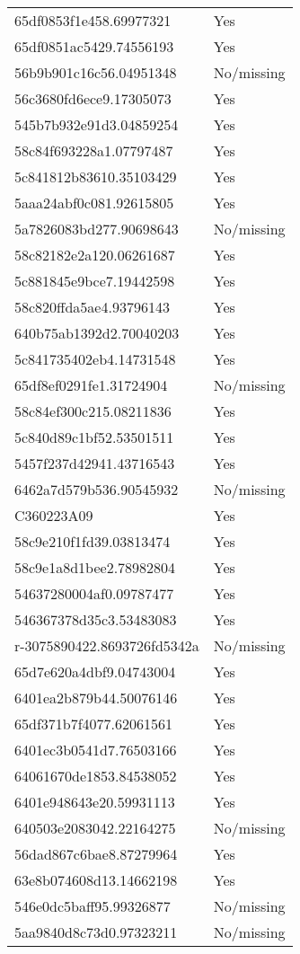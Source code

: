 \begin{tabular}{ll}
65df0853f1e458.69977321 & Yes \\
65df0851ac5429.74556193 & Yes \\
56b9b901c16c56.04951348 & No/missing \\
56c3680fd6ece9.17305073 & Yes \\
545b7b932e91d3.04859254 & Yes \\
58c84f693228a1.07797487 & Yes \\
5c841812b83610.35103429 & Yes \\
5aaa24abf0c081.92615805 & Yes \\
5a7826083bd277.90698643 & No/missing \\
58c82182e2a120.06261687 & Yes \\
5c881845e9bce7.19442598 & Yes \\
58c820ffda5ae4.93796143 & Yes \\
640b75ab1392d2.70040203 & Yes \\
5c841735402eb4.14731548 & Yes \\
65df8ef0291fe1.31724904 & No/missing \\
58c84ef300c215.08211836 & Yes \\
5c840d89c1bf52.53501511 & Yes \\
5457f237d42941.43716543 & Yes \\
6462a7d579b536.90545932 & No/missing \\
C360223A09 & Yes \\
58c9e210f1fd39.03813474 & Yes \\
58c9e1a8d1bee2.78982804 & Yes \\
54637280004af0.09787477 & Yes \\
546367378d35c3.53483083 & Yes \\
r-3075890422.8693726fd5342a & No/missing \\
65d7e620a4dbf9.04743004 & Yes \\
6401ea2b879b44.50076146 & Yes \\
65df371b7f4077.62061561 & Yes \\
6401ec3b0541d7.76503166 & Yes \\
64061670de1853.84538052 & Yes \\
6401e948643e20.59931113 & Yes \\
640503e2083042.22164275 & No/missing \\
56dad867c6bae8.87279964 & Yes \\
63e8b074608d13.14662198 & Yes \\
546e0dc5baff95.99326877 & No/missing \\
5aa9840d8c73d0.97323211 & No/missing \\

\end{tabular}
